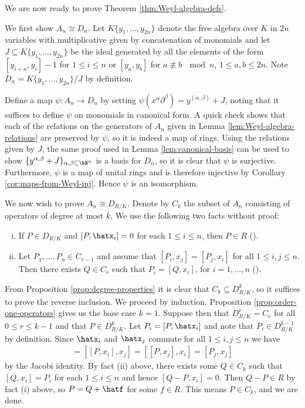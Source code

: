 \bigskip

\noindent We are now ready to prove Theorem \ref{thm:Weyl-algebra-defs}.
\begin{prf}
	We first show $A_n \cong D_n$. Let $K\{y_1,...,y_{2n}\}$ denote the free algebra over $K$ in $2n$ variables with multiplicative given by concatenation of monomials and let $J\subseteq K\{y_1,...,y_{2n}\}$ be the ideal generated by all the elements of the form $[y_{i+n},y_{i}] - 1$ for $1\leq i\leq n$ or $[y_a,y_b]$ for $a \not\equiv b ~ \mod n$, $1\leq a,b\leq 2n$. Note $D_n = K\{y_1,...,y_{2n}\}/J$ by definition. 

	Define a map $\psi: A_n\to D_n$ by setting $\psi(x^\alpha\partial^\beta) = y^{(\alpha,\beta)} + J$, noting that it suffices to define $\psi$ on monomials in canonical form. A quick check shows that each of the relations on the generators of $A_n$ given in Lemma \ref{lem:Weyl-algebra-relations} are preserved by $\psi$, so it is indeed a map of rings. Using the relations given by $J$, the same proof used in Lemma \ref{lem:canonical-basis} can be used to show $\{y^{\alpha,\beta} + J\}_{\alpha,\beta \subseteq \bN^n}$ is a basis for $D_n$, so it is clear that $\psi$ is surjective. Furthermore, $\psi$ is a map of unital rings and is therefore injective by Corollary \ref{cor:maps-from-Weyl-inj}. Hence $\psi$ is an isomorphism.

	We now wish to prove $A_n \cong D_{R/K}$. Denote by $C_k$ the subset of $A_n$ consisting of operators of degree at most $k$. We use the following two facts without proof:
	\begin{enumerate}[(i)]
		\item If $P \in D_{R/K}$ and $[P,\hatx_i] = 0$ for each $1\leq i\leq n$, then $P \in R$ \hspace{1em} (\cite[Lemma 3.2.1]{d-mod-primer}).
		\item Let $P_1,...,P_n \in C_{r-1}$ and assume that $[P_i,x_j] = [P_j,x_i]$ for all $1\leq i,j\leq n$. Then there exists $Q \in C_r$ such that $P_i = [Q,x_i]$, for $i=1,...,n$ \hspace{1em} (\cite[Lemma 3.2.2]{d-mod-primer}).
	\end{enumerate}
	From  Proposition \ref{prop:degree-properties} it is clear that $C_k \subseteq D^k_{R/K}$, so it suffices to prove the reverse inclusion. We proceed by induction. Proposition \ref{prop:order-one-operators} gives us the base case $k = 1$. Suppose then that $D^r_{R/K} = C_r$ for all $0\leq r \leq k - 1$ and that $P \in D^k_{R/K}$. Let $P_i = [P,\hatx_i]$ and note that $P_i \in D^{k-1}_{R/K}$ by definition. Since $\hatx_i$ and $\hatx_j$ commute for all $1\leq i,j \leq n$ we have
	\begin{align*}
		[P_i,x_j] = [[P,x_i],x_j] = [[P,x_j],x_i] = [P_j,x_j]
	\end{align*}
	by the Jacobi identity. By fact (ii) above, there exists some $Q \in C_k$ such that $[Q,x_i] = P_i$ for each $1\leq i\leq n$ and hence $[Q - P,x_i] = 0$. Then $Q - P \in R$ by fact (i) above, so $P = Q + \hatf$ for some $f \in R$. This means $P \in C_k$, and we are done.
\end{prf}

